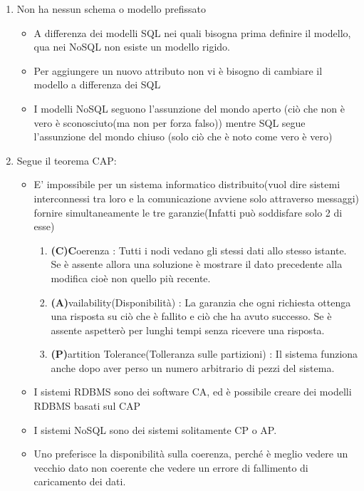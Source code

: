 \documentclass[a4page, 11pt]{article}
\begin{document}
\begin{enumerate}[noitemsep]
	 
	\item
	Non ha nessun schema o modello prefissato
	\begin{itemize}
		
		\item
		A differenza dei modelli SQL nei quali bisogna prima definire il modello, qua nei NoSQL non esiste un modello rigido.
		\item
		Per aggiungere un nuovo attributo non vi è bisogno di cambiare il modello a differenza dei SQL
		\item
		I modelli NoSQL seguono l'assunzione del mondo aperto (ciò che non è vero è sconosciuto(ma non per forza falso)) mentre SQL segue l'assunzione del mondo chiuso (solo ciò che è noto come vero è vero)
	\end{itemize}

	\def\labelenumi{\arabic{enumi}.}
	 
	\item
	Segue il teorema CAP:
	\begin{itemize}
		\item E' impossibile per un sistema informatico distribuito(vuol dire sistemi interconnessi tra loro e la comunicazione avviene solo attraverso messaggi) fornire simultaneamente le tre garanzie(Infatti può soddisfare solo 2 di esse)
		\begin{enumerate}		
			\item
			\textbf{(C)C}oerenza : Tutti i nodi vedano gli stessi dati allo stesso istante. Se è assente allora una soluzione è mostrare il dato precedente alla modifica cioè non quello più recente.
			\item
			\textbf{(A)}vailability(Disponibilità) : La garanzia che ogni richiesta ottenga una risposta su ciò che è fallito e ciò che ha avuto successo. Se è assente aspetterò per lunghi tempi senza ricevere una risposta.
			\item
			\textbf{(P)}artition Tolerance(Tolleranza sulle partizioni) : Il sistema funziona anche dopo aver perso un numero arbitrario di pezzi del sistema.
		\end{enumerate}
		\item
		I sistemi RDBMS sono dei software CA, ed è possibile creare dei modelli RDBMS basati sul CAP
		\item
		I sistemi NoSQL sono dei sistemi solitamente CP o AP.
		\item
		Uno preferisce la disponibilità sulla coerenza, perché è meglio vedere un vecchio dato non coerente che vedere un errore di fallimento di caricamento dei dati.
	\end{itemize}


\end{enumerate}
\end{document}
